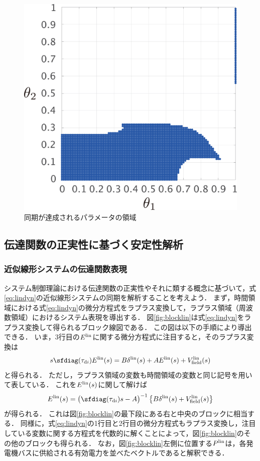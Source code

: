 \documentclass[a4j,10pt,oneside,openany,dvipdfmx]{jsbook}
\begin{document}
\begin{figure}[t]
{\begin{minipage}{0.32\linewidth}
    \centering
    \includegraphics[width = .85\linewidth]{figs/gam5}
  \end{minipage}
  \caption{同期が達成されるパラメータの領域}
  \label{fig:gamsta}
  }
\end{figure}



\subsection{伝達関数の正実性に基づく安定性解析}

\subsubsection{近似線形システムの伝達関数表現}

システム制御理論における伝達関数の正実性やそれに類する概念に基づいて，式\eqref{eq:lindyn}の近似線形システムの同期を解析することを考えよう．
まず，時間領域における式\eqref{eq:lindyn}の微分方程式をラプラス変換して，ラプラス領域（周波数領域）におけるシステム表現を導出する．
図\ref{fig:blocklin}は式\eqref{eq:lindyn}をラプラス変換して得られるブロック線図である．
この図は以下の手順により導出できる．
いま，3行目の$E^{\rm lin}$に関する微分方程式に注目すると，そのラプラス変換は
\[
s \sfdiag(\tau_{{\rm d}i}) E^{\rm lin}(s)
= B \delta^{\rm lin}(s) + A E^{\rm lin}(s) + V^{\rm lin}_{\rm field}(s)
\]
と得られる．
ただし，ラプラス領域の変数も時間領域の変数と同じ記号を用いて表している．
これを$E^{\rm lin}(s)$に関して解けば
\[
E^{\rm lin}(s) = \bigl( \sfdiag(\tau_{{\rm d}i})s -A \bigr)^{-1} 
\left\{ B \delta^{\rm lin}(s)
+ V^{\rm lin}_{\rm field}(s) \right\}
\]
が得られる．
これは図\ref{fig:blocklin}の最下段にある右と中央のブロックに相当する．
同様に，式\eqref{eq:lindyn}の1行目と2行目の微分方程式もラプラス変換し，注目している変数に関する方程式を代数的に解くことによって，図\ref{fig:blocklin}のその他のブロックも得られる．
なお，図\ref{fig:blocklin}左側に位置する$P^{\rm lin}$は，各発電機バスに供給される有効電力を並べたベクトルであると解釈できる．
\end{document}
